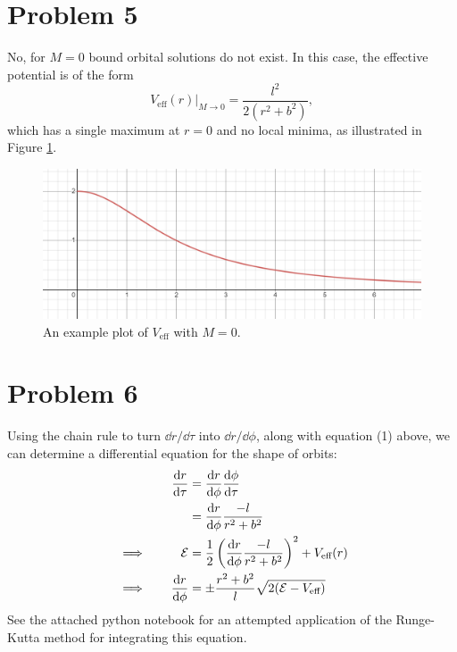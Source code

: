 \documentclass[12pt]{article}
\begin{document}
\section*{Problem 5}
No, for $M=0$ bound orbital solutions do not exist. In this case, the effective potential is of the form
\[ V_\text{eff}(r)\big|_{M\to0} = \frac{l^2}{2(r^2 + b^2)}, \]
which has a single maximum at $r=0$ and no local minima, as illustrated in Figure \ref{fig1}.
\begin{figure}[h]
    \includegraphics[scale=0.6]{NoMass.PNG}
    \centering
    \caption{An example plot of $V_\text{eff}$ with $M=0$.}
    \label{fig1}
\end{figure}

\section*{Problem 6}
Using the chain rule to turn $\dd r /\dd\tau$ into $\dd r/ \dd \phi$, along with equation (1) above, we can determine a differential equation for the shape of orbits:
\begin{alignat*}{3}
    & & \dv{r}{\tau} &= \dv{r}{\phi}\dv{\phi}{\tau} \\
    & &  &= \dv{r}{\phi}\frac{-l}{r^2 + b^2} \\
    &\implies \quad & \mathcal{E} &= \frac{1}{2}\left(\dv{r}{\phi}\frac{-l}{r^2 + b^2}\right)^2 + V_\text{eff}(r) \\
    &\implies \quad & \dv{r}{\phi} &= \pm \frac{r^2 + b^2}{l}\sqrt{2(\mathcal{E} - V_\text{eff})} \\
\end{alignat*}
See the attached python notebook for an attempted application of the Runge-Kutta method for integrating this equation.
\end{document}
